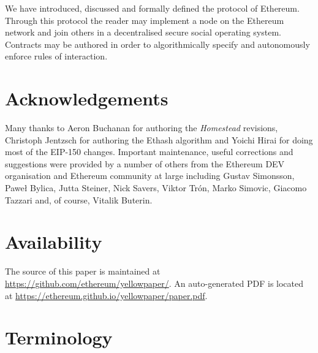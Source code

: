 \documentclass[9pt,oneside]{amsart}
\begin{document}
\begin{multicols}{2}
We have introduced, discussed and formally defined the protocol of Ethereum. Through this protocol the reader may implement a node on the Ethereum network and join others in a decentralised secure social operating system. Contracts may be authored in order to algorithmically specify and autonomously enforce rules of interaction.

\section{Acknowledgements}

Many thanks to Aeron Buchanan for authoring the \textit{Homestead} revisions, Christoph Jentzsch for authoring the Ethash algorithm and Yoichi Hirai for doing most of the EIP-150 changes. Important maintenance, useful corrections and suggestions were provided by a number of others from the Ethereum DEV organisation and Ethereum community at large including Gustav Simonsson, Pawe\l{} Bylica, Jutta Steiner, Nick Savers, Viktor Tr\'{o}n, Marko Simovic, Giacomo Tazzari and, of course, Vitalik Buterin.

\section{Availability}

The source of this paper is maintained at \url{https://github.com/ethereum/yellowpaper/}. An auto-generated PDF is located at \url{https://ethereum.github.io/yellowpaper/paper.pdf}.




\end{multicols}

\appendix

\section{Terminology} \label{ch:Terminology}
\end{document}
